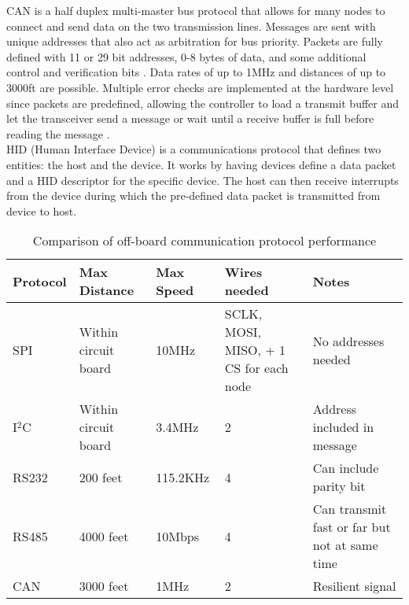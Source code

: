 \newline
CAN is a half duplex multi-master bus protocol that allows for many nodes to connect and send data on the two transmission lines. Messages are sent with unique addresses that also act as arbitration for bus priority. Packets are fully defined with 11 or 29 bit addresses, 0-8 bytes of data, and some additional control and verification bits \cite{CAN_Guide,CAN_Requirements}. Data rates of up to 1MHz and distances of up to 3000ft are possible. Multiple error checks are implemented at the hardware level since packets are predefined, allowing the controller to load a transmit buffer and let the transceiver send a message or wait until a receive buffer is full before reading the message \cite{CANvSPI}. \\
\newline
HID (Human Interface Device) is a communications protocol that defines two entities: the host and the device.  It works by having devices define a data packet and a HID descriptor for the specific device. The host can then receive interrupts from the device during which the pre-defined data packet is transmitted from device to host.  

\begin{table}[H]
	\begin{center}
		\caption{Comparison of off-board communication protocol performance}
		\label{tbl:Comm_Compare}
		\begin{tabular} {| l | l | p{2cm} | p{2.5cm} | p{2.5cm} |}
			\hline
			Protocol & Max Distance & Max Speed & Wires needed & Notes \\ \hline
			SPI & Within circuit board & 10MHz & SCLK, MOSI, MISO, + 1 CS for each node & No addresses needed \\
			\hline
			I$^2$C & Within circuit board & 3.4MHz & 2 & Address included in message \\
			\hline
			RS232 & 200 feet & 115.2KHz & 4 & Can include parity bit \\
			\hline
			RS485 & 4000 feet & 10Mbps & 4 & Can transmit fast or far but not at same time \\
			\hline
			CAN & 3000 feet & 1MHz & 2 & Resilient signal \\
			\hline
		\end{tabular}
	\end{center}
\end{table}


